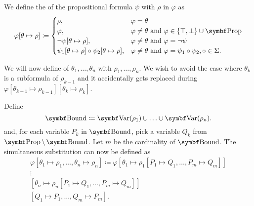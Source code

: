 \begin{definition}\label{def:propositional_substition}\mbox{}
  \begin{DefEnum}
     We define the  of the propositional formula \( \psi \) with \( \rho \) in \( \varphi \) as
    \begin{equation}\label{eq:def:propositional_substition/single}
      \varphi[\theta \mapsto \rho] \coloneqq \begin{cases}
        \rho,                                                          &\varphi = \theta \\
        \varphi,                                                       &\varphi \neq \theta \T{and} \varphi \in \{ \top, \bot \} \cup \Bold{Prop} \\
        \neg \psi[\theta \mapsto \rho],                                &\varphi \neq \theta \T{and} \varphi = \neg \psi \\
        \psi_1[\theta \mapsto \rho] \circ \psi_2[\theta \mapsto \rho], &\varphi \neq \theta \T{and} \varphi = \psi_1 \circ \psi_2, \circ \in \Sigma.
      \end{cases}
    \end{equation}

     We will now define  of \( \theta_1, \ldots, \theta_n \) with \( \rho_1, \ldots, \rho_n \). We wish to avoid the case where \( \theta_k \) is a subformula of \( \rho_{k-1} \) and it accidentally gets replaced during \( \varphi[\theta_{k-1} \mapsto \rho_{k-1}][\theta_k \mapsto \rho_k] \).

    Define
    \begin{equation*}
      \Cat{Bound} \coloneqq \Bold{Var}(\rho_1) \cup \ldots \cup \Bold{Var}(\rho_n).
    \end{equation*}
    and, for each variable \( P_k \) in \( \Cat{Bound} \), pick a variable \( Q_k \) from \( \Bold{Prop} \setminus \Bold{Bound} \). Let \( m \) be the \hyperref[def:cardinal]{cardinality} of \( \Bold{Bound} \). The simultaneous substitution can now be defined as
    \begin{align*}
      \varphi[\theta_1 \mapsto \rho_1, \ldots, \theta_n \mapsto \rho_n] \coloneqq \varphi
      [\theta_1 \mapsto \rho_1[P_1 \mapsto Q_1, \ldots, P_m \mapsto Q_m]] \\
      \vdots \hspace{3cm} \\
      [\theta_n \mapsto \rho_n[P_1 \mapsto Q_1, \ldots, P_m \mapsto Q_m]] \\
      [Q_1 \mapsto P_1, \ldots, Q_m \mapsto P_m].
    \end{align*}
  \end{DefEnum}
\end{definition}


